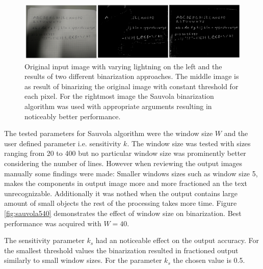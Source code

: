 \documentclass{article}
\begin{document}
    \begin{figure}[!ht]
      \centering
      \includegraphics[natwidth=2140,natheight=546,scale=0.24]{binarization.png}
      \caption{Original input image with varying lightning on the left and the results of two different binarization approaches. The middle image is as result of binarizing the original image with constant threshold for each pixel. For the rightmost image the Sauvola binarization algorithm was used with appropriate arguments resulting in noticeably better performance. \label{fig:binarization}}
    \end{figure}


    The tested parameters for Sauvola algorithm were the window size $W$ and the user defined parameter i.e. sensitivity $k$. The window size was tested with sizes ranging from 20 to 400 but no particular window size was prominently better considering the number of lines. However when reviewing the output images manually some findings were made: Smaller windows sizes such as window size 5, makes the components in output image more and more fractioned an the text unrecognizable. Additionally it was nothed when the output contains large amount of small objects the rest of the processing takes more time. Figure \ref{fig:sauvola540} demonstrates the effect of window size on binarization. Best performance was acquired with $W = 40$.

    The sensitivity parameter $k_s$ had an noticeable effect on the output accuracy. For the smallest threshold values the binarization resulted in fractioned output similarly to small window sizes. For the parameter $k_s$ the chosen value is 0.5.
\end{document}
